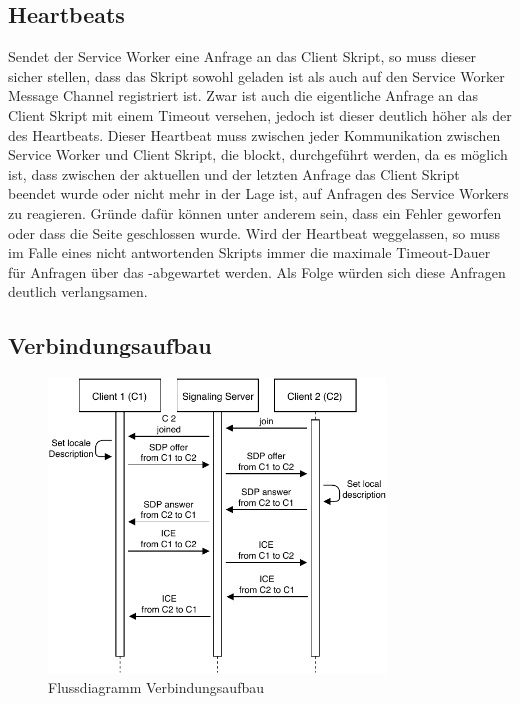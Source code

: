 \subsection{Heartbeats}

Sendet der Service Worker eine Anfrage an das Client Skript, so muss dieser sicher stellen, dass das Skript sowohl geladen ist als auch auf den Service Worker Message Channel registriert ist. Zwar ist auch die eigentliche Anfrage an das Client Skript mit einem Timeout versehen, jedoch ist dieser deutlich höher als der des Heartbeats. Dieser Heartbeat muss zwischen jeder Kommunikation zwischen Service Worker und Client Skript, die blockt, durchgeführt werden, da es möglich ist, dass zwischen der aktuellen und der letzten Anfrage das Client Skript beendet wurde oder nicht mehr in der Lage ist, auf Anfragen des Service Workers zu reagieren. Gründe dafür können unter anderem sein, dass ein Fehler geworfen oder dass die Seite geschlossen wurde. Wird der Heartbeat weggelassen, so muss im Falle eines nicht antwortenden Skripts immer die maximale Timeout-Dauer für Anfragen über das \pTp-\cdn abgewartet werden. Als Folge würden sich diese Anfragen deutlich verlangsamen.

\subsection{Verbindungsaufbau}
\begin{figure}[!h]
	\centering
	\includegraphics[width=0.8\textwidth]{figures/verbindungsaufbau}
	\caption[Flussdiagramm Verbindungsaufbau]{Flussdiagramm Verbindungsaufbau}
	\label{fig:verbindungsaufbau}
\end{figure}


